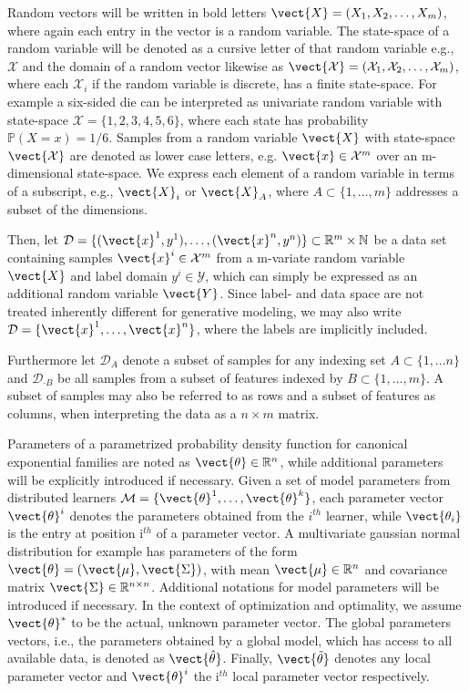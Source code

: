     Random vectors will be written in bold letters $\vect{X} = (X_1, X_2, \ldots, X_m)$, where again each entry in the vector is a random variable.
    The state-space of a random variable will be denoted as a cursive letter of that random variable e.g., $\mathcal{X}$ and the domain of a random vector likewise as $\vect{\mathcal{X}} = (\mathcal{X}_1, \mathcal{X}_2, \ldots, \mathcal{X}_m)$, where each $\mathcal{X}_i$ if the random variable is discrete, has a finite state-space.
    For example a six-sided die can be interpreted as univariate random variable with state-space $\mathcal{X} = \{1,2,3,4,5,6\}$, where each state has probability $\mathbb{P}(X=x) = 1/6$.
    Samples from a random variable $\vect{X}$  with state-space $\vect{\mathcal{X}}$ are denoted as lower case letters, e.g. $\vect{x} \in \mathcal{X}^m$ over an m-dimensional state-space.
    We express each element of a random variable in terms of a subscript, e.g., $\vect{X}_i$ or $\vect{X}_A$, where $A \subset\{1, \ldots, m\} $ addresses a subset of the dimensions.

    Then, let $\mathcal{D} = \{(\vect{x}^1, y^1), \ldots, (\vect{x}^n, y^n)\} \subset \mathbb{R}^m \times \mathbb{N}$ be a data set containing samples $\vect{x}^i \in \mathcal{X}^m$ from a m-variate random variable $\vect{X}$ and label domain $y^i \in \mathcal{Y}$, which can simply be expressed as an additional random variable $\vect{Y}$.
    Since label- and data space are not treated inherently different for generative modeling, we may also write $\mathcal{D} = \{\vect{x}^1, \ldots, \vect{x}^n\}$, where the labels are implicitly included.

    Furthermore let $\mathcal{D}_A$ denote a subset of samples for any indexing set $A\subset \{1, \ldots n\}$ and $\mathcal{D}_{\cdot B}$ be all samples from a subset of features indexed by $B \subset \{1, \ldots, m\}$.
    A subset of samples may also be referred to as rows and a subset of features as columns, when interpreting the data as a $n \times m$ matrix.  

    Parameters of a parametrized probability density function for canonical exponential families are noted as $\vect{\theta} \in \mathbb{R}^n$, while additional parameters will be explicitly introduced if necessary.
    Given a set of model parameters from distributed learners $\mathcal{M} = \{\vect{\theta}^1,  \ldots, \vect{\theta}^k\}$, each parameter vector $\vect{\theta}^i$ denotes the parameters obtained from the  $i^{th}$ learner, while $\vect{\theta_i}$ is the entry at position i$^{th}$ of a parameter vector.
    A multivariate gaussian normal distribution for example has parameters of the form $\vect{\theta} = (\vect{\mu}, \vect{\Sigma})$, with mean $\vect{\mu} \in \mathbb{R}^{n}$ and covariance matrix $\vect{\Sigma} \in \mathbb{R}^{n \times n}$.
    Additional notations for model parameters will be introduced if necessary.
    In the context of optimization and optimality, we assume $\vect{\theta}^*$ to be the actual, unknown parameter vector.
    The global parameters vectors, i.e., the parameters obtained by a global model, which has access to all available data, is denoted as  $\vect{\hat{\theta}}$.
    Finally, $\vect{\tilde{\theta}}$ denotes any local parameter vector and $\vect{\theta}^{i}$ the i$^{th}$ local parameter vector respectively.

